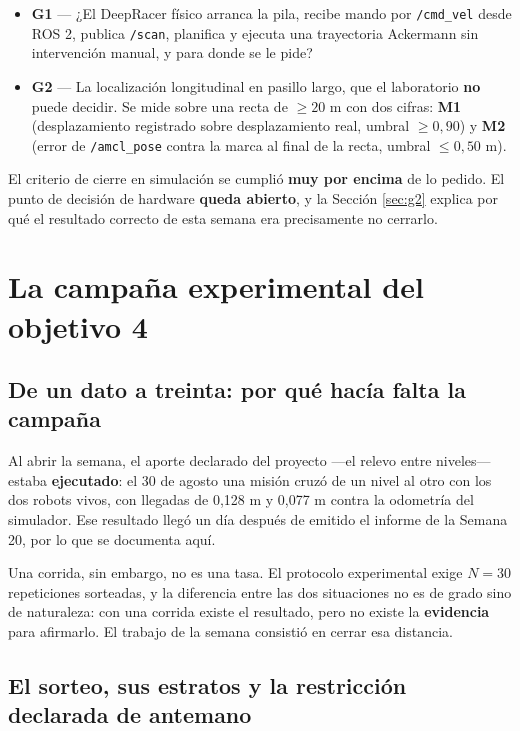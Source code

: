 \documentclass[12pt,letterpaper]{article}
\begin{document}
\begin{itemize}[leftmargin=*]
    \item \textbf{G1} --- ¿El DeepRacer físico arranca la pila, recibe mando por \texttt{/cmd\_vel} desde ROS 2, publica \texttt{/scan}, planifica y ejecuta una trayectoria Ackermann sin intervención manual, y para donde se le pide?
    \item \textbf{G2} --- La localización longitudinal en pasillo largo, que el laboratorio \textbf{no} puede decidir. Se mide sobre una recta de $\geq 20$ m con dos cifras: \textbf{M1} (desplazamiento registrado sobre desplazamiento real, umbral $\geq 0{,}90$) y \textbf{M2} (error de \texttt{/amcl\_pose} contra la marca al final de la recta, umbral $\leq 0{,}50$ m).
\end{itemize}

El criterio de cierre en simulación se cumplió \textbf{muy por encima} de lo pedido. El punto de decisión de hardware \textbf{queda abierto}, y la Sección \ref{sec:g2} explica por qué el resultado correcto de esta semana era precisamente no cerrarlo.

\section{La campaña experimental del objetivo 4}
\label{sec:campana}

\subsection{De un dato a treinta: por qué hacía falta la campaña}

Al abrir la semana, el aporte declarado del proyecto ---el relevo entre niveles--- estaba \textbf{ejecutado}: el 30 de agosto una misión cruzó de un nivel al otro con los dos robots vivos, con llegadas de 0,128 m y 0,077 m contra la odometría del simulador. Ese resultado llegó un día después de emitido el informe de la Semana 20, por lo que se documenta aquí.

Una corrida, sin embargo, no es una tasa. El protocolo experimental exige $N = 30$ repeticiones sorteadas, y la diferencia entre las dos situaciones no es de grado sino de naturaleza: con una corrida existe el resultado, pero no existe la \textbf{evidencia} para afirmarlo. El trabajo de la semana consistió en cerrar esa distancia.

\subsection{El sorteo, sus estratos y la restricción declarada de antemano}
\end{document}
